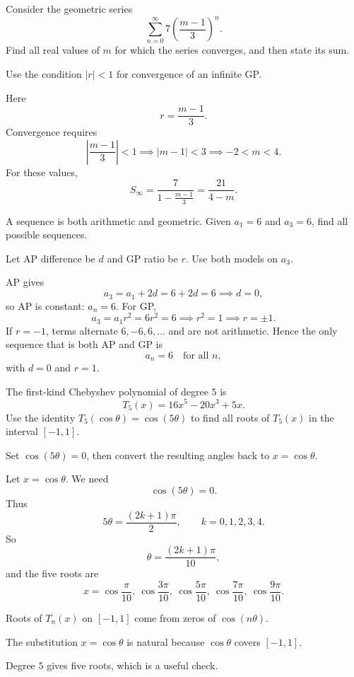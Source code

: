 \begin{problem}
Consider the geometric series
\[
\sum_{n=0}^{\infty} 7\left(\frac{m-1}{3}\right)^n.
\]
Find all real values of $m$ for which the series converges, and then state its sum.
\end{problem}
\begin{hint}
Use the condition $|r|<1$ for convergence of an infinite GP.
\end{hint}
\begin{solution}
Here
\[
r=\frac{m-1}{3}.
\]
Convergence requires
\[
\left|\frac{m-1}{3}\right|<1 \implies |m-1|<3 \implies -2<m<4.
\]
For these values,
\[
S_\infty=\frac{7}{1-\frac{m-1}{3}}=\frac{21}{4-m}.
\]
\end{solution}

\begin{problem}
A sequence is both arithmetic and geometric. Given $a_1=6$ and $a_3=6$, find all possible sequences.
\end{problem}
\begin{hint}
Let AP difference be $d$ and GP ratio be $r$. Use both models on $a_3$.
\end{hint}
\begin{solution}
AP gives
\[
a_3=a_1+2d=6+2d=6 \implies d=0,
\]
so AP is constant: $a_n=6$.
For GP,
\[
a_3=a_1r^2=6r^2=6 \implies r^2=1 \implies r=\pm 1.
\]
If $r=-1$, terms alternate $6,-6,6,\ldots$ and are not arithmetic.
Hence the only sequence that is both AP and GP is
\[
a_n=6\quad \text{for all }n,
\]
with $d=0$ and $r=1$.
\end{solution}

\begin{problem}
The first-kind Chebyshev polynomial of degree $5$ is
\[
T_5(x)=16x^5-20x^3+5x.
\]
Use the identity $T_5(\cos\theta)=\cos(5\theta)$ to find all roots of $T_5(x)$ in the interval $[-1,1]$.
\end{problem}
\begin{hint}
Set $\cos(5\theta)=0$, then convert the resulting angles back to $x=\cos\theta$.
\end{hint}
\begin{solution}
Let $x=\cos\theta$. We need
\[
\cos(5\theta)=0.
\]
Thus
\[
5\theta=\frac{(2k+1)\pi}{2},\qquad k=0,1,2,3,4.
\]
So
\[
\theta=\frac{(2k+1)\pi}{10},
\]
and the five roots are
\[
x=\cos\frac{\pi}{10},\ \cos\frac{3\pi}{10},\ \cos\frac{5\pi}{10},\ \cos\frac{7\pi}{10},\ \cos\frac{9\pi}{10}.
\]
\end{solution}
\begin{takeaways}
\item Roots of $T_n(x)$ on $[-1,1]$ come from zeros of $\cos(n\theta)$.
\item The substitution $x=\cos\theta$ is natural because $\cos\theta$ covers $[-1,1]$.
\item Degree $5$ gives five roots, which is a useful check.
\end{takeaways}

